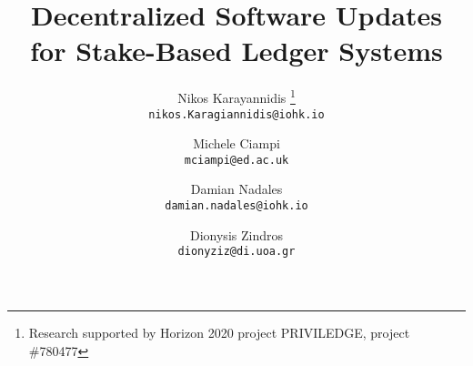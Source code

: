 \title{Decentralized Software Updates\\for Stake-Based Ledger Systems}

\author{
  Nikos Karayannidis  \fnmsep \thanks{Research supported by Horizon 2020 
  project PRIVILEDGE, 
  	project 
  	\#780477} \\
	{\small \texttt{nikos.Karagiannidis@iohk.io}} \\
	\and   
  Michele Ciampi \\
  {\small \texttt{mciampi@ed.ac.uk}}\\
  \and	
  Damian Nadales \\
  {\small \texttt{damian.nadales@iohk.io}} \\
  \and
  Dionysis Zindros \\
 {\small \texttt{dionyziz@di.uoa.gr}}		
}

\let\oldaddcontentsline\addcontentsline
\def\addcontentsline#1#2#3{}
\maketitle
\def\addcontentsline#1#2#3{\oldaddcontentsline{#1}{#2}{#3}}